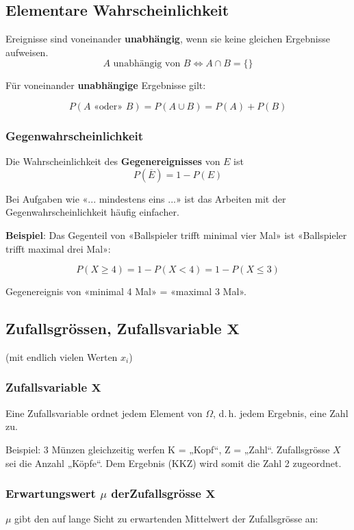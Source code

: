 \begin{multicols}{2}
\subsection*{Elementare Wahrscheinlichkeit}
Ereignisse sind voneinander \textbf{unabhängig}, wenn sie keine
gleichen Ergebnisse aufweisen.
$$A \textrm{ unabhängig von } B \Leftrightarrow A\cap B=\{\}$$

Für voneinander \textbf{unabhängige} Ergebnisse 
gilt:

$$P(A\textrm{ «oder» }B) = P(A\cup B) = P(A) + P(B)$$
\headerUndFooterDieseSeite{}


\subsubsection*{Gegenwahrscheinlichkeit}
Die Wahrscheinlichkeit des \textbf{Gegenereignisses} von $E$ ist
$$P(\overline{E}) = 1- P(E)$$

Bei Aufgaben wie «... mindestens eins ...» ist das Arbeiten mit der
Gegenwahrscheinlichkeit häufig einfacher.

\textbf{Beispiel}: Das Gegenteil von «Ballspieler trifft minimal vier Mal»
ist «Ballspieler trifft maximal drei Mal»:

$$P(X \ge 4) = 1 - P(X < 4) = 1-P(X\le 3)$$

Gegenereignis von «minimal 4 Mal» = «maximal 3 Mal».

\headerUndFooterDieseSeite{}

\forceCB{}
\subsection*{Zufallsgrössen, Zufallsvariable $\mathbf{X}$}
\headerUndFooterDieseSeite{}

(mit endlich vielen Werten $x_i$)

\subsubsection*{Zufallsvariable $\mathbf{X}$}

Eine Zufallsvariable ordnet jedem Element von $\Omega$, d.\,h. jedem
Ergebnis, eine Zahl zu.

Beispiel: 3 Münzen gleichzeitig werfen K = „Kopf“, Z = „Zahl“.
Zufallsgrösse $X$ sei \zB die Anzahl „Köpfe“.
Dem Ergebnis (KKZ) wird somit die Zahl 2 zugeordnet.

\subsubsection*{Erwartungswert $\mu$ derZufallsgrösse $\mathbf{X}$}
$\mu$ gibt den auf lange Sicht zu erwartenden Mittelwert der
Zufallsgrösse an:


\end{multicols}
